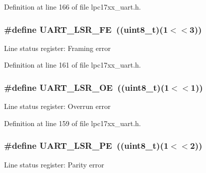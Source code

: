\-Definition at line 166 of file lpc17xx\-\_\-uart.\-h.

\hypertarget{group___u_a_r_t___private___macros_ga18b1661d7c37ab40c9310311dd4f647d}{
\subsubsection[{\-U\-A\-R\-T\-\_\-\-L\-S\-R\-\_\-\-F\-E}]{\setlength{\rightskip}{0pt plus 5cm}\#define {\bf \-U\-A\-R\-T\-\_\-\-L\-S\-R\-\_\-\-F\-E}~((uint8\-\_\-t)(1$<$$<$3))}}\label{group___u_a_r_t___private___macros_ga18b1661d7c37ab40c9310311dd4f647d}
\-Line status register\-: \-Framing error 

\-Definition at line 161 of file lpc17xx\-\_\-uart.\-h.

\hypertarget{group___u_a_r_t___private___macros_ga85c4312a700f6033bf0a075ae41de57c}{
\subsubsection[{\-U\-A\-R\-T\-\_\-\-L\-S\-R\-\_\-\-O\-E}]{\setlength{\rightskip}{0pt plus 5cm}\#define {\bf \-U\-A\-R\-T\-\_\-\-L\-S\-R\-\_\-\-O\-E}~((uint8\-\_\-t)(1$<$$<$1))}}\label{group___u_a_r_t___private___macros_ga85c4312a700f6033bf0a075ae41de57c}
\-Line status register\-: \-Overrun error 

\-Definition at line 159 of file lpc17xx\-\_\-uart.\-h.

\hypertarget{group___u_a_r_t___private___macros_ga3ae0ee26be22b855aa08d68a2801d3d2}{
\subsubsection[{\-U\-A\-R\-T\-\_\-\-L\-S\-R\-\_\-\-P\-E}]{\setlength{\rightskip}{0pt plus 5cm}\#define {\bf \-U\-A\-R\-T\-\_\-\-L\-S\-R\-\_\-\-P\-E}~((uint8\-\_\-t)(1$<$$<$2))}}\label{group___u_a_r_t___private___macros_ga3ae0ee26be22b855aa08d68a2801d3d2}
\-Line status register\-: \-Parity error 

